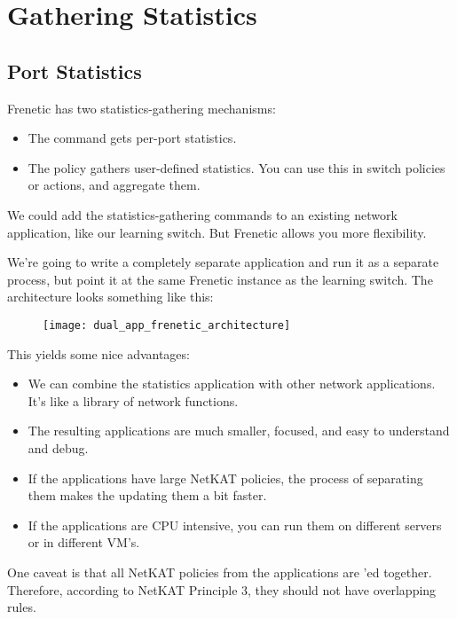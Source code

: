 
\chapter{Gathering Statistics}
\label{chapter:statistics}

\section{Port Statistics}

Frenetic has two statistics-gathering mechanisms:

\begin{itemize}
\item The  command gets per-port statistics.
\item The  policy gathers user-defined statistics.  You can use this in switch
policies or  actions, and aggregate them.
\end{itemize}

We could add the statistics-gathering commands to an existing network application, like our learning
switch.  But Frenetic allows you more flexibility.   

We're going to write a completely separate application and run it as a separate process, but point it
at the same Frenetic instance as the learning switch.  The architecture looks something like this:

\begin{figure}[h]
\centering
\texttt{[image: dual\_app\_frenetic\_architecture]}
\end{figure}

This yields some nice advantages:

\begin{itemize}
\item We can combine the statistics application with other network applications.  It's like a 
library of network functions.
\item The resulting applications are much smaller, focused, and easy to understand and debug.
\item If the applications have large NetKAT policies, the process of separating them makes the 
updating them a bit faster.
\item If the applications are CPU intensive, you can run them on different servers or in different VM's.
\end{itemize}

One caveat is that all NetKAT policies from the applications are 'ed together.  
Therefore, according
to NetKAT Principle 3, they should not have overlapping rules.  

